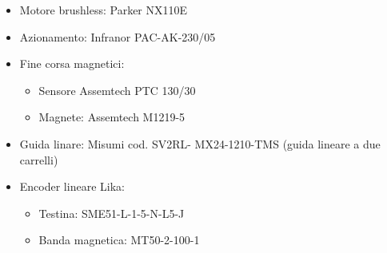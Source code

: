 \documentclass{article}
\begin{document}
\begin{itemize}

\item Motore brushless: Parker NX110E
\item Azionamento: Infranor PAC-AK-230/05
\item Fine corsa magnetici: 
\begin{itemize}
    \item Sensore Assemtech PTC 130/30
    \item Magnete: Assemtech M1219-5
\end{itemize}
\item Guida linare: Misumi cod. SV2RL- MX24-1210-TMS (guida lineare a due carrelli)
\item Encoder lineare Lika:
\begin{itemize}
    \item Testina: SME51-L-1-5-N-L5-J
    \item Banda magnetica: MT50-2-100-1
\end{itemize}
\end{itemize}
\end{document}
